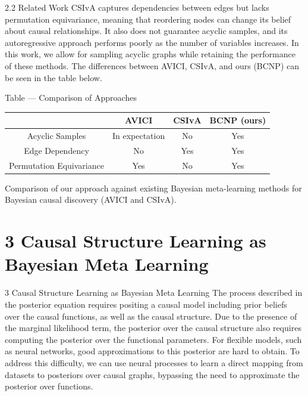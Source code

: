 \documentclass[aspectratio=169,10pt]{beamer}
\begin{document}
\begin{frame}{2.2 Related Work}
\small
CSIvA captures dependencies between edges but lacks permutation equivariance, meaning that reordering nodes can change its belief about causal relationships. It also does not guarantee acyclic samples, and its autoregressive approach performs poorly as the number of variables increases. In this work, we allow for sampling acyclic graphs while retaining the performance of these methods. The differences between AVICI, CSIvA, and ours (BCNP) can be seen in the table below.
\end{frame}

\begin{frame}{Table --- Comparison of Approaches}
\centering
\begin{tabular}{cccc}
\toprule
& AVICI & CSIvA & BCNP (ours) \\
\midrule
Acyclic Samples  &  In expectation  &  No     &  Yes      \\
Edge Dependency   & No  &  Yes     &   Yes    \\
Permutation Equivariance  & Yes  &  No      & Yes      \\
\bottomrule
\end{tabular}

\vspace{0.3cm}
{\footnotesize Comparison of our approach against existing Bayesian meta-learning methods for Bayesian causal discovery (AVICI and CSIvA).}
\end{frame}

\section{3 Causal Structure Learning as Bayesian Meta Learning}

\begin{frame}{3 Causal Structure Learning as Bayesian Meta Learning}
The process described in the posterior equation requires positing a causal model including prior beliefs over the causal functions, as well as the causal structure. Due to the presence of the marginal likelihood term, the posterior over the causal structure also requires computing the posterior over the functional parameters. For flexible models, such as neural networks, good approximations to this posterior are hard to obtain. To address this difficulty, we can use neural processes to learn a direct mapping from datasets to posteriors over causal graphs, bypassing the need to approximate the posterior over functions.
\end{frame}
\end{document}
